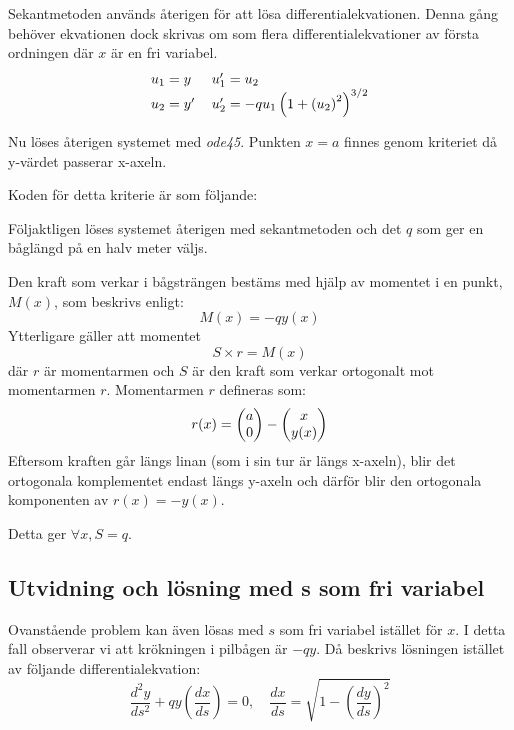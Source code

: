\documentclass[a4paper,11pt,twoside]{article}
\newcommand*\colvec[3][]{
    \begin{pmatrix}\ifx\relax#1\relax\else#1\\\fi#2\\#3\end{pmatrix}
}
\begin{document}
Sekantmetoden används återigen för att lösa differentialekvationen. Denna gång behöver ekvationen dock skrivas om som flera differentialekvationer av första ordningen där $x$ är en fri variabel.
\begin{align}
\begin{tabular}{ l l }
	$u_1 = y$ & $u_1' = u_2$ \\
	$u_2 = y'$ & $u_2' = -qu_1\left(1 + \left(u_2\right)^2\right)^{3/2}$
\end{tabular}
\nonumber
\end{align}

Nu löses återigen systemet med \textit{ode45}. Punkten $x=a$ finnes genom  kriteriet då y-värdet passerar x-axeln.

Koden för detta kriterie är som följande:
\begin{listing}


\end{listing}

Följaktligen löses systemet återigen med sekantmetoden och det $q$ som ger en båglängd på en halv meter väljs.

Den kraft som verkar i bågsträngen bestäms med hjälp av momentet i en punkt, $M(x)$, som beskrivs enligt:
\begin{equation}\label{eq:moment}
M(x) = -qy(x)
\end{equation}
Ytterligare gäller att momentet
\begin{equation}
	S \times r = M(x)
\end{equation}
där $r$ är momentarmen och $S$ är den kraft som verkar ortogonalt mot momentarmen $r$. Momentarmen $r$ defineras som:
\begin{equation}
	r(x) = \colvec{a}{0}-\colvec{x}{y(x)}
\end{equation}
Eftersom kraften går längs linan (som i sin tur är längs x-axeln), blir det ortogonala komplementet endast längs y-axeln och därför blir den ortogonala komponenten av $r(x) = -y(x)$.

Detta ger $\forall x, S = q$.

\subsection{Utvidning och lösning med s som fri variabel}
Ovanstående problem kan även lösas med $s$ som fri variabel istället för $x$. I detta fall observerar vi att krökningen i pilbågen är $-qy$. Då beskrivs lösningen istället av följande differentialekvation:
\begin{equation}
	\dfrac{d^2y}{ds^2}+qy\left(\dfrac{dx}{ds}\right)=0, \quad \dfrac{dx}{ds} = \sqrt{1-\left(\dfrac{dy}{ds}\right)^2}
\end{equation}
\end{document}
